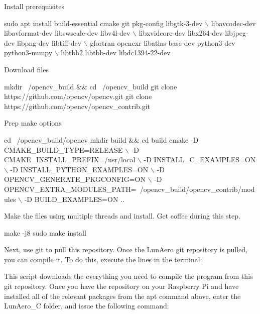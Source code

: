 \begin{DoxyItemize}
\item Install prerequisites 
\begin{DoxyCode}
sudo apt install build-essential cmake git pkg-config libgtk-3-dev \(\backslash\)
libavcodec-dev libavformat-dev libswscale-dev libv4l-dev \(\backslash\)
libxvidcore-dev libx264-dev libjpeg-dev libpng-dev libtiff-dev \(\backslash\)
gfortran openexr libatlas-base-dev python3-dev python3-numpy \(\backslash\)
libtbb2 libtbb-dev libdc1394-22-dev
\end{DoxyCode}

\item Download files 
\begin{DoxyCode}
mkdir ~/opencv\_build && cd ~/opencv\_build
git clone https://github.com/opencv/opencv.git
git clone https://github.com/opencv/opencv\_contrib.git
\end{DoxyCode}

\item Prep make options 
\begin{DoxyCode}
cd ~/opencv\_build/opencv
mkdir build && cd build
cmake -D CMAKE\_BUILD\_TYPE=RELEASE \(\backslash\)
    -D CMAKE\_INSTALL\_PREFIX=/usr/local \(\backslash\)
    -D INSTALL\_C\_EXAMPLES=ON \(\backslash\)
    -D INSTALL\_PYTHON\_EXAMPLES=ON \(\backslash\)
    -D OPENCV\_GENERATE\_PKGCONFIG=ON \(\backslash\)
    -D OPENCV\_EXTRA\_MODULES\_PATH=~/opencv\_build/opencv\_contrib/modules \(\backslash\)
    -D BUILD\_EXAMPLES=ON ..
\end{DoxyCode}

\item Make the files using multiple threads and install. Get coffee during this step. 
\begin{DoxyCode}
make -j8
sudo make install
\end{DoxyCode}

\end{DoxyItemize}

Next, use {\ttfamily git} to pull this repository. Once the Lun\+Aero {\ttfamily git} repository is pulled, you can compile it. To do this, execute the lines in the terminal\+:




This script downloads the everything you need to compile the program from this {\ttfamily git} repository. Once you have the repository on your Raspberry Pi and have installed all of the relevant packages from the {\ttfamily apt} command above, enter the Lun\+Aero\+\_\+C folder, and issue the following command\+:


